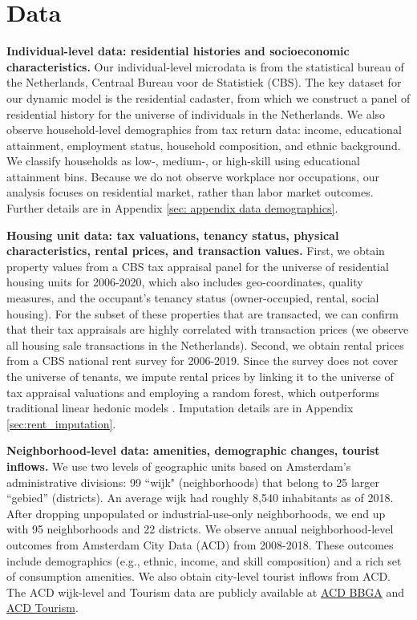 \documentclass[11pt]{article}
\newcommand{\Paragraph}{\vspace{0.1cm}\noindent\textbf}
\begin{document}
\section{Data}\label{sec: data}


\Paragraph{Individual-level data: residential histories and socioeconomic characteristics.} Our individual-level microdata is from the statistical bureau of the Netherlands, Centraal Bureau voor de Statistiek (CBS). The key dataset for our dynamic model is the residential cadaster, from which we construct a panel of residential history for the universe of individuals in the Netherlands. We also observe household-level demographics from tax return data: income, educational attainment, employment status, household composition, and ethnic background. We classify households as low-, medium-, or high-skill using educational attainment bins. Because we do not observe workplace nor occupations, our analysis focuses on residential market, rather than labor market outcomes. Further details are in Appendix \ref{sec: appendix data demographics}.

\Paragraph{Housing unit data: tax valuations, tenancy status, physical characteristics, rental prices, and transaction values.} First, we obtain property values from a CBS tax appraisal panel for the universe of residential housing units for 2006-2020, which also includes geo-coordinates, quality measures, and the occupant's tenancy status (owner-occupied, rental, social housing). For the subset of these properties that are transacted, we can confirm that their tax appraisals are highly correlated with transaction prices (we observe all housing sale transactions in the Netherlands). Second, we obtain rental prices from a CBS national rent survey for 2006-2019. Since the survey does not cover the universe of tenants, we impute rental prices by linking it to the universe of tax appraisal valuations and employing a random forest, which outperforms traditional linear hedonic models \citep{mullainathan2017machine}. Imputation details are in Appendix \ref{sec:rent_imputation}. 

\Paragraph{Neighborhood-level data: amenities, demographic changes, tourist inflows.} We use two levels of geographic units based on Amsterdam's administrative divisions: 99 ``wijk" (neighborhoods) that belong to 25 larger ``gebied'' (districts). An average wijk had roughly 8,540 inhabitants as of 2018. After dropping unpopulated or industrial-use-only neighborhoods, we end up with 95 neighborhoods and 22 districts. We observe annual neighborhood-level outcomes from  Amsterdam City Data (ACD) from 2008-2018. These outcomes include demographics (e.g., ethnic, income, and skill composition) and a rich set of consumption amenities.  We also obtain city-level tourist inflows from ACD.  The ACD wijk-level and Tourism data are publicly available at \href{https://onderzoek.amsterdam.nl/dataset/basisbestand-gebieden-amsterdam-bbga}{ACD BBGA} and \href{https://data.amsterdam.nl/dossiers/dossier/toerisme/fdcc54a1-5aa7-4ddf-af16-1c28a99b8c5f/?term=toerisme}{ACD Tourism}.
\end{document}
